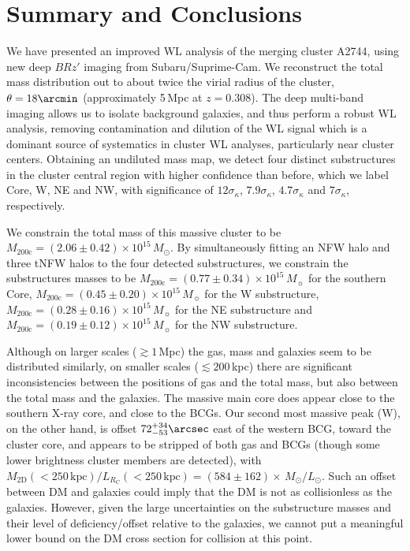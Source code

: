 \documentclass[iop,twocolumn]{emulateapj}
\def\munit{\mbox{$10^{15}\,M_\sun$}}
\begin{document}
\section{Summary and Conclusions}
\label{sec:summary}
We have presented an improved WL analysis of the merging cluster A2744, using new deep $BRz'$ imaging from Subaru/Suprime-Cam. We reconstruct the total mass distribution out to about twice the virial radius of the cluster, $\theta=18\arcmin$ (approximately 5\,Mpc at $z=0.308$).
The deep multi-band imaging allows us to isolate background galaxies, and thus perform a robust WL analysis, removing contamination and dilution of the WL signal which is a dominant source of systematics in cluster WL analyses, particularly near cluster centers. Obtaining an undiluted mass map, we detect four distinct substructures in the cluster central region with higher confidence than before, which we label Core, W, NE and NW, with significance of $12\sigma_\kappa$, $7.9\sigma_\kappa$, $4.7\sigma_\kappa$ and  $7\sigma_\kappa$, respectively. 

We constrain the total mass of this massive cluster to be $M_\mathrm{200c} = (2.06\pm0.42)\times 10^{15}\,M_{\odot}$. By simultaneously fitting an NFW halo and three  tNFW halos to the four detected substructures, we constrain the substructures masses to be $M_\mathrm{200c} = (0.77\pm0.34)\times\munit$ for the southern Core, $M_\mathrm{200c} = (0.45\pm0.20)\times\munit$ for the W substructure, $M_\mathrm{200c} = (0.28\pm0.16)\times\munit$ for the NE substructure and $M_\mathrm{200c} = (0.19\pm0.12)\times\munit$ for the NW substructure. 

Although on larger scales ($\gtrsim1$\,Mpc) the gas, mass and galaxies
seem to be distributed similarly, on smaller scales ($\lesssim200$\,kpc)
there are significant inconsistencies between the positions of gas and the total mass, but
also between the total mass and the galaxies. The massive main core does
appear close to the southern X-ray core, and close to the BCGs. Our second most massive peak (W), on the other hand, is offset $72^{+34}_{-53}\arcsec$ east of the western BCG, toward the cluster core, and appears to be stripped of
both gas and BCGs (though some lower brightness cluster members are detected), with $M_\mathrm{2D}(<250\,\mathrm{kpc})/L_{R_{\mathrm C}}(<250\,\mathrm{kpc}) =(584\pm162)\times\,M_\odot/L_{\odot}$. Such  an offset between DM and galaxies could imply that the DM is not as collisionless as the galaxies.
However, given the large uncertainties on the substructure masses and their level of deficiency/offset relative to the galaxies, we cannot put a meaningful lower bound on the DM cross section for collision at this point.
\end{document}
